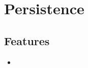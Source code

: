 \section{Persistence}
\label{module:Persistence}

\subsection{Features}
\begin{itemize}
	\item {}
\end{itemize}